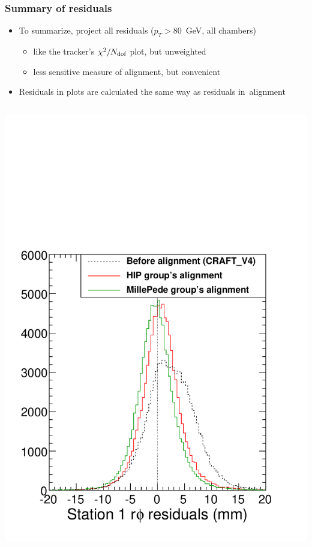 \documentclass[compress]{beamer}
\begin{document}
\begin{frame}
\frametitle{Summary of residuals}

\begin{itemize}
\item To summarize, project all residuals ($p_T > 80$~GeV, all chambers)
\begin{itemize}
\item like the tracker's $\chi^2/N_{\mbox{\scriptsize dof}}$ plot, but unweighted
\item less sensitive measure of alignment, but convenient
\end{itemize}
\item Residuals in plots are calculated the same way as residuals \mbox{in alignment\hspace{-1 cm}}
\end{itemize}

\begin{columns}
\includegraphics[width=\linewidth]{raw_station1.pdf}


\end{columns}
\end{frame}
\end{document}
